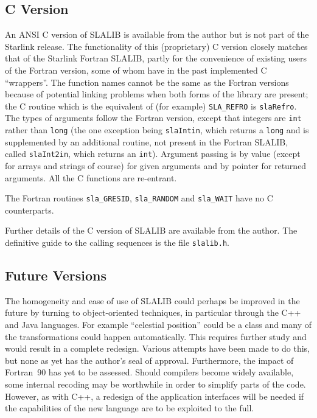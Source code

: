 \documentclass[11pt,twoside]{article}
\begin{document}
\subsection{C Version}
An ANSI C version of SLALIB is available from the author
but is not part of the Starlink release.
The functionality of this (proprietary) C version closely matches
that of the Starlink Fortran SLALIB, partly for the convenience of
existing users of the Fortran version, some of whom have in the past
implemented C ``wrappers''.  The function names
cannot be the same as the Fortran versions because of potential
linking problems when
both forms of the library are present; the C routine which
is the equivalent of (for example) {\tt SLA\_REFRO} is {\tt slaRefro}.
The types of arguments follow the Fortran version, except
that integers are {\tt int} rather than {\tt long} (the one
exception being
{\tt slaIntin}, which returns a {\tt long}
and is supplemented by an additional routine,
not present in the Fortran SLALIB, called {\tt slaInt2in}, which returns
an {\tt int}).
Argument passing is by value
(except for arrays and strings of course)
for given arguments and by pointer for returned arguments.
All the C functions are re-entrant.

The Fortran routines {\tt sla\_GRESID}, {\tt sla\_RANDOM} and
{\tt sla\_WAIT} have no C counterparts.

Further details of the C version of SLALIB are available
from the author.  The definitive guide to
the calling sequences is the file {\tt slalib.h}.

\subsection{Future Versions}
The homogeneity and ease of use of SLALIB could perhaps be improved
in the future by turning to object-oriented techniques, in particular
through the C++ and Java languages.  For example ``celestial
position'' could be a class and many of the transformations
could happen automatically.  This requires further study and
would result in a complete redesign.  Various attempts have been
made to do this, but none as yet has the author's seal of
approval.  Furthermore,
the impact of Fortran~90 has yet to be assessed.  Should compilers
become widely available, some internal recoding may be worthwhile
in order to simplify parts of the code.  However, as with C++,
a redesign of the
application interfaces will be needed if the capabilities of the
new language are to be exploited to the full.
\end{document}
